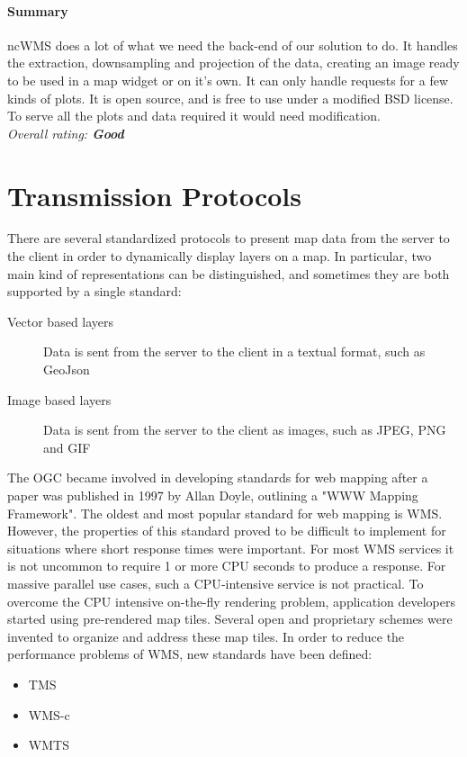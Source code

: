 \documentclass[11pt,a4paper,titlepage,oneside]{report}
\begin{document}
    \paragraph{Summary}
    ncWMS does a lot of what we need the \gls{back-end} of our solution to do. It handles the extraction, downsampling and projection of the data, creating an image ready to be used in a map widget or on it's own. It can only handle requests for a few kinds of plots. It is \gls{open source}, and is free to use under a modified \gls{BSD} license. To serve all the plots and data required it would need modification.
  \\ \emph{Overall rating: \textbf{Good}}

\section{Transmission Protocols}
  There are several standardized \glspl{protocol} to present map data from the server to the client in order to dynamically display layers on a map.
  In particular, two main kind of representations can be distinguished, and sometimes they are both supported by a single standard:
  \begin{description}
    \item[Vector based layers] Data is sent from the server to the client in a textual format, such as GeoJson
    \item[Image based layers] Data is sent from the server to the client as images, such as \gls{JPEG}, \gls{PNG} and \gls{GIF}
  \end{description}

  The \acrfull{OGC} became involved in developing standards for web mapping after a paper was published in 1997 by Allan Doyle, outlining a "WWW Mapping Framework". The oldest and most popular standard for web mapping is \gls{WMS}. However, the properties of this standard proved to be difficult to implement for situations where short response times were important. For most \gls{WMS} services it is not uncommon to require 1 or more \gls{CPU} seconds to produce a response. For massive parallel use cases, such a \gls{CPU}-intensive service is not practical. To overcome the \gls{CPU} intensive on-the-fly rendering problem, application developers started using pre-rendered map tiles. Several open and proprietary schemes were invented to organize and address these map tiles. 
  In order to reduce the performance problems of \gls{WMS}, new standards have been defined:
  \begin{itemize}
    \item TMS
    \item WMS-c
    \item WMTS
  \end{itemize}
  
\end{document}
